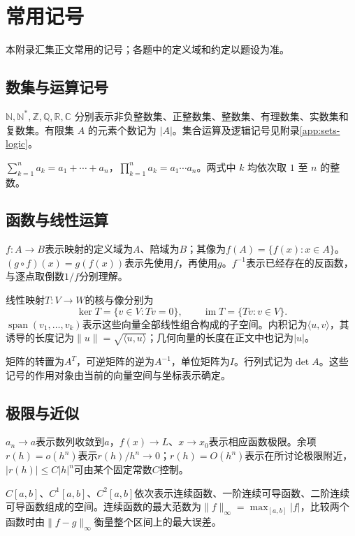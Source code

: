 \chapter{常用记号}
\label{app:notation}

本附录汇集正文常用的记号；各题中的定义域和约定以题设为准。

\section{数集与运算记号}
\(\mathbb N,\mathbb N^*,\mathbb Z,\mathbb Q,\mathbb R,\mathbb C\) 分别表示非负整数集、正整数集、整数集、有理数集、实数集和复数集。有限集 \(A\) 的元素个数记为 \(|A|\)。集合运算及逻辑记号见附录\ref{app:sets-logic}。

\(\sum_{k=1}^{n}a_k=a_1+\cdots+a_n\)，\(\prod_{k=1}^{n}a_k=a_1\cdots a_n\)。两式中 \(k\) 均依次取 \(1\) 至 \(n\) 的整数。

\section{函数与线性运算}

\(f:A\to B\)表示映射的定义域为\(A\)、陪域为\(B\)；其像为\(f(A)=\{f(x):x\in A\}\)。\((g\circ f)(x)=g(f(x))\)表示先使用\(f\)，再使用\(g\)。\(f^{-1}\)表示已经存在的反函数，与逐点取倒数\(1/f\)分别理解。

线性映射\(T:V\to W\)的核与像分别为
\begin{equation*}
 \ker T=\{v\in V:Tv=0\},\qquad
 \operatorname{im}T=\{Tv:v\in V\}.
\end{equation*}
\(\operatorname{span}(v_1,\ldots,v_k)\)表示这些向量全部线性组合构成的子空间。内积记为\(\langle u,v\rangle\)，其诱导的长度记为\(\|u\|=\sqrt{\langle u,u\rangle}\)；几何向量的长度在正文中也记为\(|u|\)。

矩阵的转置为\(A^T\)，可逆矩阵的逆为\(A^{-1}\)，单位矩阵为\(I\)。行列式记为\(\det A\)。这些记号的作用对象由当前的向量空间与坐标表示确定。

\section{极限与近似}

\(a_n\to a\)表示数列收敛到\(a\)，\(f(x)\to L\)、\(x\to x_0\)表示相应函数极限。余项\(r(h)=o(h^n)\)表示\(r(h)/h^n\to0\)；\(r(h)=O(h^n)\)表示在所讨论极限附近，\(|r(h)|\le C|h|^n\)可由某个固定常数\(C\)控制。

\(C[a,b]\)、\(C^1[a,b]\)、\(C^2[a,b]\)依次表示连续函数、一阶连续可导函数、二阶连续可导函数组成的空间。连续函数的最大范数为\(\|f\|_\infty=\max_{[a,b]}|f|\)，比较两个函数时由\(\|f-g\|_\infty\)衡量整个区间上的最大误差。
